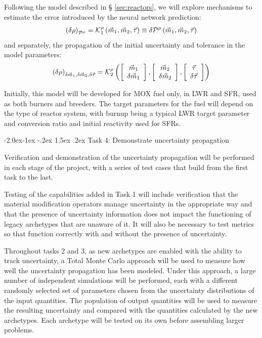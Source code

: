 \documentclass[dvips,11pt]{article}
\makeatletter
\newcommand{\unc}[1]
{ \delta #1 }
\newcommand{\uncvector}[1]
{ \left[ \begin{array}{c} #1 \\ \delta #1 \end{array} \right] }
\renewcommand\subsection{\@startsection{subsection}{2}{\z@}%
                                     {-2.0ex\@plus -1ex \@minus -.2ex}%
                                     {1.5ex \@plus .2ex}%
                                     {\normalfont\bfseries}}%
\makeatother
\begin{document}
Following the model described in \S
\ref{sec:reactors}, we will explore mechanisms to
estimate the error introduced by the neural
network prediction:
\begin{align}
  \left(\unc{\rho}\right)_{\cal P^\rho} = {\cal K}_1^{\rho}\left( \vec{m}_{1},\vec{m}_{2}, \vec{\tau} \right) \equiv \delta {\cal P}^\rho\left( \vec{m}_{1},\vec{m}_{2}, \vec{\tau} \right)
\end{align}
and separately, the propagation of the initial uncertainty and tolerance in the model parameters:
\begin{align}
  \left(\unc{\rho}\right)_{\unc{\vec{m}_{1}},\unc{\vec{m}_{2}},\unc{\vec{\tau}}} = {\cal K}^{\rho}_2\left( \uncvector{\vec{m}_{1}},\uncvector{\vec{m}_{2}}, \uncvector{\vec{\tau}} \right)
\end{align}

Initially, this model will be developed for MOX
fuel only, in LWR and SFR, used as both burners
and breeders.  The target parameters for the fuel
will depend on the type of reactor system, with
burnup being a typical LWR target parameter and
conversion ratio and initial reactivity used for
SFRs.

\subsection{Task 4: Demonstrate uncertainty propagation}

Verification and demonstration of the uncertainty
propagation will be performed in each stage of the
project, with a series of test cases that build
from the first task to the last.

Testing of the capabilities added in Task 1 will
include verification that the material
modification operators manage uncertainty in the
appropriate way and that the presence of
uncertainty information does not impact the
functioning of legacy archetypes that are unaware
of it.  It will also be necessary to test metrics
so that function correctly with and without the
presence of uncertainty.

Throughout tasks 2 and 3, as new archetypes are
enabled with the ability to track uncertainty, a
Total Monte Carlo approach will be used to measure
how well the uncertainty propagation has been
modeled.  Under this approach, a large number of
independent simulations will be performed, each
with a different randomly selected set of
parameters chosen from the uncertainty
distributions of the input quantities.  The
population of output quantities will be used to
measure the resulting uncertainty and compared
with the quantities calculated by the new
archetypes.  Each archetype will be tested on its
own before assembling larger problems.
\end{document}
